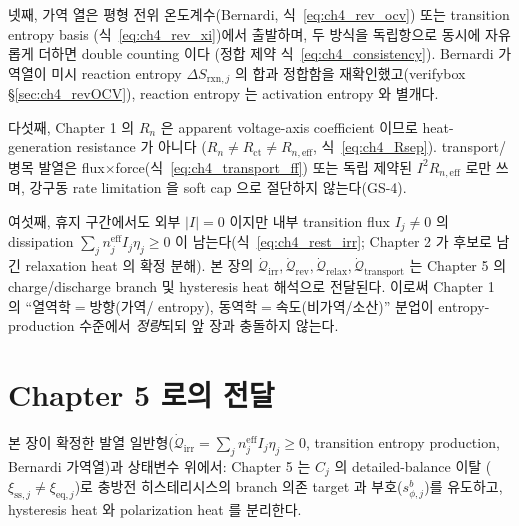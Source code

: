 \documentclass[11pt,a4paper]{article}
\newcommand{\eff}{\mathrm{eff}}
\newcommand{\eq}{\mathrm{eq}}
\newcommand{\irr}{\mathrm{irr}}
\newcommand{\rev}{\mathrm{rev}}
\newcommand{\rxn}{\mathrm{rxn}}
\newcommand{\ct}{\mathrm{ct}}
\newcommand{\rlx}{\mathrm{relax}}
\newcommand{\transp}{\mathrm{transport}}
\newcommand{\sstat}{\mathrm{ss}}
\begin{document}
넷째, 가역 열은 평형 전위 온도계수(Bernardi, 식~\eqref{eq:ch4_rev_ocv}) 또는 transition entropy basis
(식~\eqref{eq:ch4_rev_xi})에서 출발하며, 두 방식을 독립항으로 동시에 자유롭게 더하면 double counting 이다
(정합 제약 식~\eqref{eq:ch4_consistency}). Bernardi 가역열이 미시 reaction entropy $\Delta S_{\rxn,j}$ 의 합과
정합함을 재확인했고(verifybox \S\ref{sec:ch4_revOCV}), reaction entropy 는 activation entropy 와 별개다.

다섯째, Chapter 1 의 $R_n$ 은 apparent voltage-axis coefficient 이므로 heat-generation resistance 가 아니다
($R_n\ne R_\ct\ne R_{n,\eff}$, 식~\eqref{eq:ch4_Rsep}). transport/병목 발열은 flux$\times$force(식~\eqref{eq:ch4_transport_ff})
또는 독립 제약된 $I^2R_{n,\eff}$ 로만 쓰며, 강구동 rate limitation 을 soft cap 으로 절단하지 않는다(GS-4).

여섯째, 휴지 구간에서도 외부 $|I|=0$ 이지만 내부 transition flux $I_j\ne0$ 의 dissipation $\sum_j n_j^{\eff}I_j\eta_j\ge0$
이 남는다(식~\eqref{eq:ch4_rest_irr}; Chapter 2 가 후보로 남긴 relaxation heat 의 확정 분해). 본 장의
$\dot{\mathcal Q}_{\irr},\dot{\mathcal Q}_{\rev},\dot{\mathcal Q}_{\rlx},\dot{\mathcal Q}_{\transp}$ 는 Chapter 5
의 charge/discharge branch 및 hysteresis heat 해석으로 전달된다. 이로써 Chapter 1 의 ``열역학$=$방향(가역/
entropy), 동역학$=$속도(비가역/소산)'' 분업이 entropy-production 수준에서 \emph{정량}되되 앞 장과 충돌하지 않는다.

\section*{Chapter 5 로의 전달}
본 장이 확정한 발열 일반형($\dot{\mathcal Q}_\irr=\sum_j n_j^{\eff}I_j\eta_j\ge0$, transition entropy
production, Bernardi 가역열)과 상태변수 위에서: Chapter 5 는 $C_j$ 의 detailed-balance 이탈
($\xi_{\sstat,j}\ne\xi_{\eq,j}$)로 충방전 히스테리시스의 branch 의존 target 과 부호($s_{\phi,j}^b$)를 유도하고,
hysteresis heat 와 polarization heat 를 분리한다.
\end{document}
